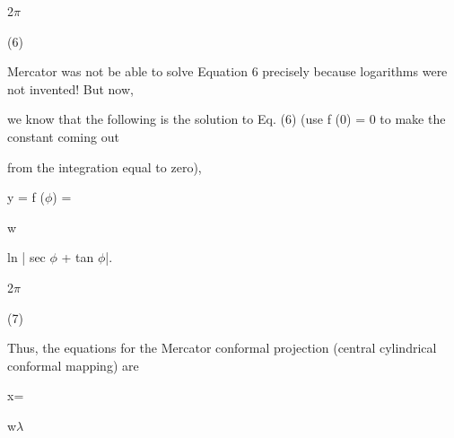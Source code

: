 \documentclass[a4paper,portrait,12pt]{article}
\begin{document}
\begin{flushleft}
2$\pi$
\end{flushleft}





(6)





\begin{flushleft}
Mercator was not be able to solve Equation 6 precisely because logarithms were not invented! But now,
\end{flushleft}


\begin{flushleft}
we know that the following is the solution to Eq. (6) (use f (0) = 0 to make the constant coming out
\end{flushleft}


\begin{flushleft}
from the integration equal to zero),
\end{flushleft}


\begin{flushleft}
y = f ($\phi$) =
\end{flushleft}





\begin{flushleft}
w
\end{flushleft}


\begin{flushleft}
ln | sec $\phi$ + tan $\phi$|.
\end{flushleft}


\begin{flushleft}
2$\pi$
\end{flushleft}





(7)





\begin{flushleft}
Thus, the equations for the Mercator conformal projection (central cylindrical conformal mapping) are
\end{flushleft}


\begin{flushleft}
x=
\end{flushleft}





\begin{flushleft}
w$\lambda$
\end{flushleft}
\end{document}

